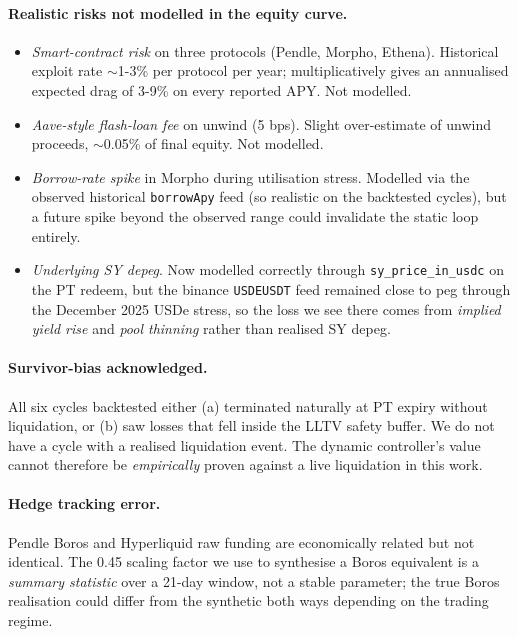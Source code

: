 \documentclass[11pt,a4paper]{article}
\begin{document}
\paragraph{Realistic risks not modelled in the equity curve.}
\begin{itemize}[topsep=2pt,itemsep=0pt]
  \item \emph{Smart-contract risk} on three protocols (Pendle,
        Morpho, Ethena). Historical exploit rate \(\sim\)1-3\%
        per protocol per year; multiplicatively gives an
        annualised expected drag of 3-9\% on every reported
        APY. Not modelled.
  \item \emph{Aave-style flash-loan fee} on unwind (5 bps).
        Slight over-estimate of unwind proceeds, \(\sim\)0.05\%
        of final equity. Not modelled.
  \item \emph{Borrow-rate spike} in Morpho during utilisation
        stress. Modelled via the observed historical
        \texttt{borrowApy} feed (so realistic on the backtested
        cycles), but a future spike beyond the observed range
        could invalidate the static loop entirely.
  \item \emph{Underlying SY depeg}. Now modelled correctly
        through \texttt{sy\_price\_in\_usdc} on the PT redeem,
        but the binance \texttt{USDEUSDT} feed remained close to
        peg through the December 2025 USDe stress, so the loss
        we see there comes from \emph{implied yield rise} and
        \emph{pool thinning} rather than realised SY depeg.
\end{itemize}

\paragraph{Survivor-bias acknowledged.} All six cycles backtested
either (a) terminated naturally at PT expiry without liquidation,
or (b) saw losses that fell inside the LLTV safety buffer. We do
not have a cycle with a realised liquidation event. The dynamic
controller's value cannot therefore be \emph{empirically} proven
against a live liquidation in this work.

\paragraph{Hedge tracking error.} Pendle Boros and Hyperliquid raw
funding are economically related but not identical. The 0.45
scaling factor we use to synthesise a Boros equivalent is a
\emph{summary statistic} over a 21-day window, not a stable
parameter; the true Boros realisation could differ from the
synthetic both ways depending on the trading regime.
\end{document}
